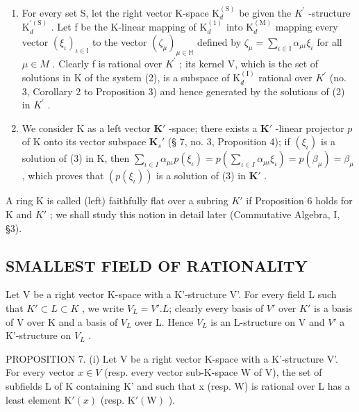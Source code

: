 \begin{enumerate}
\def\labelenumi{(\roman{enumi})}
\item
  For every set S, let the right vector K-space \(\mathrm{K}_{d}^{(\mathrm{S})}\) be given the \(K^{\prime}\) -structure \(\mathrm{K}_{d}^{\prime(\mathrm{S})}\) . Let f be the K-linear mapping of \(\mathrm{K}_{d}^{(1)}\) into \(\mathrm{K}_{d}^{(\mathrm{M})}\) mapping every vector \((\xi_{\iota})_{\iota\in\mathbb{I}}\) to the vector \((\zeta_{\mu})_{\mu\in\mathbb{M}}\) defined by \(\zeta_{\mu}=\sum_{\iota\in\mathbb{I}}\alpha_{\mu\iota}\xi_{\iota}\) for all \(\mu\in M\) . Clearly f is rational over \(K^{\prime}\) ; its kernel V, which is the set of solutions in K of the system (2), is a subspace of \(\mathrm{K}_{d}^{(\mathrm{I})}\) rational over \(K^{\prime}\) (no. 3, Corollary 2 to Proposition 3) and hence generated by the solutions of (2) in \(K^{\prime}\) .
\item
  We consider K as a left vector \(\mathbf{K}'\) -space; there exists a \(\mathbf{K}'\) -linear projector \(p\) of K onto its vector subspace \(\mathbf{K}_s'\) (§ 7, no. 3, Proposition 4); if \((\xi_{\iota})\) is a solution of (3) in K, then \(\sum_{\iota \in I} \alpha_{\mu \iota} p(\xi_{\iota}) = p\left(\sum_{\iota \in I} \alpha_{\mu \iota} \xi_{\iota}\right) = p(\beta_\mu) = \beta_\mu\) , which proves that \((p(\xi_{\iota}))\) is a solution of (3) in \(\mathbf{K}'\) .
\end{enumerate}

A ring K is called (left) faithfully flat over a subring \(K'\) if Proposition 6 holds for K and \(K'\) ; we shall study this notion in detail later (Commutative Algebra, I, §3).

\subsection{SMALLEST FIELD OF RATIONALITY}

Let V be a right vector K-space with a K'-structure V'. For every field L such that \(K' \subset L \subset K\) , we write \(V_{L} = V'. L\); clearly every basis of \(V'\) over \(K'\) is a basis of V over K and a basis of \(V_{L}\) over L. Hence \(V_{L}\) is an L-structure on V and \(V'\) a K'-structure on \(V_{L}\) .

PROPOSITION 7. (i) Let V be a right vector K-space with a K'-structure V'. For every vector \(x \in V\) (resp. every vector sub-K-space W of V), the set of subfields L of K containing K' and such that x (resp. W) is rational over L has a least element \(\mathrm{K}'(x)\) (resp. \(\mathrm{K}'(\mathrm{W})\) ).

